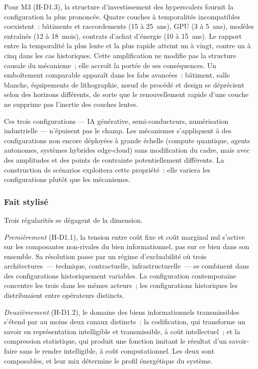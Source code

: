 Pour M3 (H-D1.3), la structure d'investissement des hyperscalers fournit la configuration la plus prononcée. Quatre couches à temporalités incompatibles coexistent~: bâtiments et raccordements (15 à 25~ans), GPU (3 à 5~ans), modèles entraînés (12 à 18~mois), contrats d'achat d'énergie (10 à 15~ans). Le rapport entre la temporalité la plus lente et la plus rapide atteint un à vingt, contre un à cinq dans les cas historiques. Cette amplification ne modifie pas la structure causale du mécanisme~; elle accroît la portée de ses conséquences. Un emboîtement comparable apparaît dans les fabs avancées~: bâtiment, salle blanche, équipements de lithographie, n\oe{}ud de procédé et design se déprécient selon des horizons différents, de sorte que le renouvellement rapide d'une couche ne supprime pas l'inertie des couches lentes.

Ces trois configurations --- IA générative, semi-conducteurs, numérisation industrielle --- n'épuisent pas le champ. Les mécanismes s'appliquent à des configurations non encore déployées à grande échelle (compute quantique, agents autonomes, systèmes hybrides edge-cloud) sans modification du cadre, mais avec des amplitudes et des points de contrainte potentiellement différents. La construction de scénarios exploitera cette propriété~: elle variera les configurations plutôt que les mécanismes.


\subsubsection{Fait stylisé}

Trois régularités se dégagent de la dimension.

\emph{Premièrement} (H-D1.1), la tension entre coût fixe et coût marginal nul s'active sur les composantes non-rivales du bien informationnel, pas sur ce bien dans son ensemble. Sa résolution passe par un régime d'excluabilité où trois architectures~--- technique, contractuelle, infrastructurelle~--- se combinent dans des configurations historiquement variables. La configuration contemporaine concentre les trois dans les mêmes acteurs~; les configurations historiques les distribuaient entre opérateurs distincts.

\emph{Deuxièmement} (H-D1.2), le domaine des biens informationnels transmissibles s'étend par au moins deux canaux distincts~: la codification, qui transforme un savoir en représentation intelligible et transmissible, à coût intellectuel~; et la compression statistique, qui produit une fonction imitant le résultat d'un savoir-faire sans le rendre intelligible, à coût computationnel. Les deux sont composables, et leur mix détermine le profil énergétique du système.

